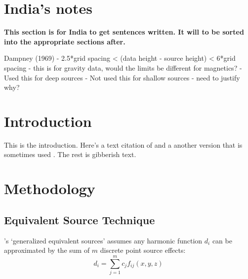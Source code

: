 \section{India's notes}
\textbf{This section is for India to get sentences written. It will to be sorted into the appropriate sections after.}

Dampney (1969)
- 2.5*grid spacing < (data height - source height) < 6*grid spacing
    - this is for gravity data, would the limits be different for magnetics?
    - Used this for deep sources
    - Not used this for shallow sources - need to justify why?




\section{Introduction}

This is the introduction. Here's a text citation of \citet{OliveiraJr2015}
and a another version that is sometimes used \citep{OliveiraJr2015}.
The rest is gibberish text.

\lipsum[1]


\section{Methodology}

\subsection{Equivalent Source Technique}
\cite{Cordell1992}'s ‘generalized equivalent sources’ assumes any harmonic function $d_i$ can be approximated by the sum of $m$ discrete point source effects:
\begin{equation}
d_i = \sum_{j=1}^{m} c_j f_{ij}(x,y,z)
\end{equation}

